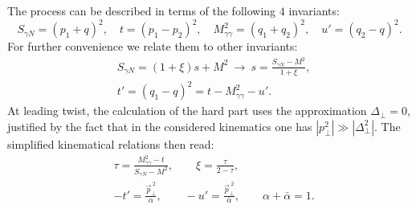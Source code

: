 \documentclass[aps,prd,superscriptaddress,floatfix,showpacs]{revtex4}
\begin{document}
The process can be described in terms of the following $4$ invariants:
\begin{equation}
S_{\gamma N} = (p_1 + q)^2, \quad t = (p_1 - p_2)^2, \quad M_{\gamma\gamma}^2 = (q_1 + q_2)^2, \quad u' = (q_2 - q)^2.
\end{equation}
For further convenience we relate them to other invariants:
\begin{equation}
\begin{aligned}
&S_{\gamma N} = (1+\xi) s + M^2 \: \rightarrow \: s = \frac{S_{\gamma N} - M^2}{1+\xi},
\\
&t' = (q_1 - q)^2 = t - M_{\gamma\gamma}^2 - u'.
\end{aligned}
\end{equation}
At leading twist, the calculation of the hard part uses the
approximation $\Delta_\perp = 0$, justified by the fact that in the considered kinematics one has $|p_\perp^2| \gg |\Delta_\perp^2|$. The simplified kinematical relations  then read:
\begin{equation}
\begin{aligned} \label{eq-kin-simplified}
& \tau = \frac{M_{\gamma\gamma}^2 - t}{S_{\gamma N} - M^2}, \qquad \xi = \frac{\tau}{2-\tau}, \\
&-t' = \frac{\vec{p}_\perp^{\:2}}{\alpha}, \qquad -u' = \frac{\vec{p}_\perp^{\:2}}{\bar{\alpha}}, \qquad \alpha + \bar{\alpha} = 1.
\end{aligned}
\end{equation}
\end{document}
